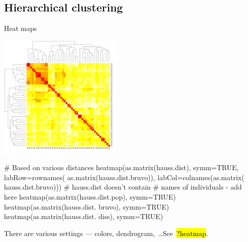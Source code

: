 \documentclass[compress, ucs, xelatex, 11pt, xcolor=svgnames,
  hyperref={
    bookmarks=true,
    unicode=true,
    colorlinks=true,
    pdftitle={Molecular data in R},
    plainpages=false,
    pdfauthor={Vojtech Zeisek},
    pdfsubject={Course about phylogeny and evolution in R},
    pdfcreator={XeLaTeX},
    pdfkeywords={R, evolution, phylogeny, molecular data},
    linkcolor=Tomato,
    anchorcolor=SaddleBrown,
    citecolor=Goldenrod,
    filecolor=DarkMagenta,
    menucolor=Sienna,
    urlcolor=DarkTurquoise,
    pdftex},
  url={hyphens, lowtilde} %
  ]{beamer}
\renewcommand{\texttt}[1]{\hl{\ttfamily #1}}
\begin{document}
\subsection{Hierarchical clustering}

\begin{frame}[fragile]{Heat maps}
\label{hierclust}
\begin{multicols}{2}
  \includegraphics[height=6cm]{heatmap.png}
  \columnbreak
  \begin{spluscode}
    # Based on various distances
    heatmap(as.matrix(hauss.dist),
      symm=TRUE, labRow=rownames(
      as.matrix(hauss.dist.bruvo)),
      labCol=colnames(as.matrix(
      hauss.dist.bruvo)))
      # hauss.dist doesn't contain
      # names of individuals - add here
    heatmap(as.matrix(hauss.dist.pop),
      symm=TRUE)
    heatmap(as.matrix(hauss.dist.
      bruvo), symm=TRUE)
    heatmap(as.matrix(hauss.dist.
      diss), symm=TRUE)
  \end{spluscode}
  \begin{footnotesize}
  There are various settings --- colors, dendrogram,~\ldots See~\texttt{?heatmap}.
  \end{footnotesize}
\end{multicols}
\end{frame}
\end{document}

